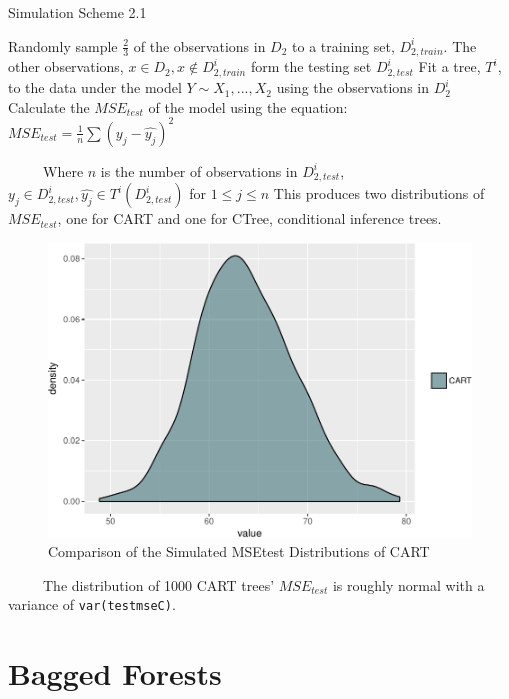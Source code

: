 \documentclass[12pt,twoside]{reedthesis}
\begin{document}
  \begin{algorithm}
  \caption{Simulation Scheme 2.1}
  \label{sim2.1}
  \begin{algorithmic}[1]
  \State Randomly sample $\frac 2 3$  of the observations in  $D_2$  to a training set,  $D_{2, train}^i$. The other observations,  $x \in D_2, x \notin D_{2, train}^i$ form the testing set $D_{2, test}^i$
  \State Fit a tree, $T^i$, to the data under the model $Y \sim X_1,...,X_2$ using the observations in      $D_{2}^i$
  \State Calculate the $MSE_{test}$ of the model using the equation:
      $MSE_{test} = \frac 1 n \sum (y_j - \hat{y_j})^2$
  \EndFor
  \end{algorithmic}
  \end{algorithm}
  
  ~~~~~Where \(n\) is the number of observations in \(D_{2, test}^i\),
  \(y_j \in D_{2, test}^i, \hat{y_j} \in T^i(D_{2, test}^i)\) for
  \(1 \leq j \leq n\) This produces two distributions of \(MSE_{test}\),
  one for CART and one for CTree, conditional inference trees.
  
  \begin{figure}[htbp]
  \centering
  \includegraphics{Thesis_files/figure-latex/cartmse-1.pdf}
  \caption{\label{fig:cartmse}Comparison of the Simulated MSEtest
  Distributions of CART}
  \end{figure}
  
  ~~~~~The distribution of 1000 CART trees' \(MSE_{test}\) is roughly
  normal with a variance of \texttt{var(testmseC)}.
  
  \section{Bagged Forests}\label{bagged-forests}
  
\end{document}
